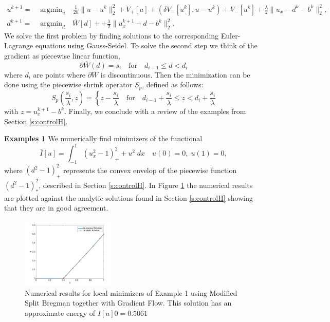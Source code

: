 \documentclass[11pt]{article}
\theoremstyle{plain}
\begin{document}
\begin{align*}
u^{k+1} = &  \;\mbox{argmin}_{u}\quad \frac{1}{2h} \|u-u^k\|_2^2  +V_+[u]+(\delta V_-[u^k],u-u^k) + V_-[u^k] + \frac{\lambda}{2} \|u_x-d^k-b^k\|_2^2,\\[2ex]
d^{k+1} = & \;\mbox{argmin}_{d}\quad  \overline{W}[d] + + \frac{\lambda}{2} \|u^{k+1}_x-d-b^k\|_2^2.
\end{align*}
We solve the first problem by finding solutions to the corresponding Euler-Lagrange equations using Gauss-Seidel. To solve the second step we think of the gradient as piecewise linear function,
\[\partial \overline{W}(d) = s_i \quad \mbox{for}\quad d_{i-1}\leq d < d_i\]
where $d_i$ are points where $\partial\overline{W}$ is discontinuous. Then the minimization can be done using the piecewise shrink operator $S_p$, defined as follows:
\begin{equation}\label{e:shrink}
S_p\left (\frac{s_i}{\lambda},z\right) = \left \{ z- \frac{s_i}{\lambda} \quad \mbox{for} \quad d_{i-1}+\frac{s_i}{\lambda} \leq z < d_i+\frac{s_i}{\lambda} \right.
\end{equation}
with $z = u_x^{k+1}-b^k$.
Finally, we conclude with a review of the examples from Section \ref{s:controlH}.

{\bf Examples 1}
We numerically find minimizers of the functional
\[ \bar{I}[u] = \int_{-1}^1 (u_x^2-1)_+^2 + u^2 \;dx \quad u(0) = 0,\; u(1) = 0,\]
where $(d^2-1)^2_+$ represents the convex envelop of the piecewise function $(d^2-1)_*^2$, described in Section \ref{s:controlH}. In Figure \ref{f:example1} the numerical results are plotted against the analytic solutions found in Section \ref{s:controlH} showing that they are in good agreement.

\begin{figure}[h]
\centering
    \includegraphics[width=0.4\textwidth]{Ex1NumSol.jpg}
 \caption{Numerical results for local minimizers of Example 1 using Modified Split Bregman together with Gradient Flow. This solution has an approximate energy of $I[u]0 = 0.5061$}\label{f:example1}
\end{figure}
\end{document}
